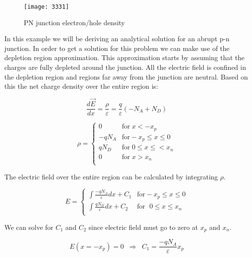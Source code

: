 \begin{figure}[!htp]
\centering
\texttt{[image: 3331]}
\caption{PN junction electron/hole density} 
\end{figure}


In this example we will be deriving an analytical solution for an abrupt p-n junction. In order to get a solution for this problem we can make use of the depletion region approximation. This approximation starts by assuming that the charges are fully depleted around the junction. All the electric field is confined in the depletion region and regions far away from the junction are neutral. Based on this the net charge density over the entire region is:

\begin{equation}
\frac{d \vec{E} }{dx}=\frac{\rho}{\varepsilon}=\frac{q}{\varepsilon}(-N_{A}+N_{D})
\end{equation}

\begin{equation}
\rho = \begin{cases}
         0 & \text{for} \;  x<-x_{p}\\
       -qN_{A} & \text{for}  -x_{p}\leq x \leq 0 \\
        qN_{D} & \text{for} \; 0 \leq x \leq< x_{n}  \\
        0 & \text{for}\;  x>x_{n} \\
     \end{cases}
\end{equation}

The electric field over the entire region can be calculated by integrating $\rho$.

\begin{equation}
E = \begin{cases}
       \int \frac{-qN_{A}}{\varepsilon}  dx+ C_{1} & \text{for}  -x_{p}\leq x \leq 0 \\
       \int \frac{qN_{D}}{\varepsilon} dx+ C_{2}   & \text{for } \; 0 \leq x \leq x_{n}  \\
     \end{cases}
\end{equation}

We can solve for $C_{1}$ and $C_{2}$ since electric field must go to zero at $x_{p}$ and $x_{n}$.

\begin{equation}
E(x=-x_{p})=0  \; \;  \Rightarrow  \;\; C_{1}= \frac{-qN_{A}}{\varepsilon}x_{p}
\end{equation}


